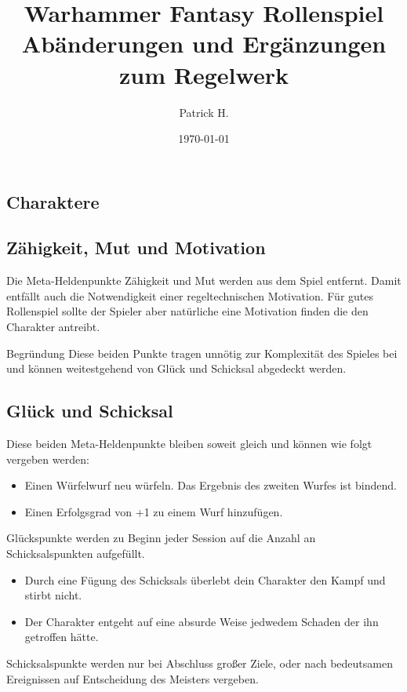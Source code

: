 \documentclass[a4paper]{article}
\title{%
  Warhammer Fantasy Rollenspiel\\
  \large Abänderungen und Ergänzungen zum Regelwerk}
\author{Patrick H.}
\date{\today}
\begin{document}

\maketitle

\vspace{1em}

\begin{multicols}{2}
  



\section{Charaktere}

\subsection{Zähigkeit, Mut und Motivation}
Die Meta-Heldenpunkte Zähigkeit und Mut werden aus dem Spiel entfernt. 
Damit entfällt auch die Notwendigkeit einer regeltechnischen Motivation. 
Für gutes Rollenspiel sollte der Spieler aber natürliche eine Motivation finden die den Charakter antreibt.

\begin{DndComment}{Begründung}
  Diese beiden Punkte tragen unnötig zur Komplexität des Spieles bei und können weitestgehend von Glück und Schicksal abgedeckt werden.
\end{DndComment}

\subsection{Glück und Schicksal}
Diese beiden Meta-Heldenpunkte bleiben soweit gleich und können wie folgt vergeben werden:
\begin{itemize}
  \item Einen Würfelwurf neu würfeln. Das Ergebnis des zweiten Wurfes ist bindend.
  \item Einen Erfolgsgrad von +1 zu einem Wurf hinzufügen.
\end{itemize}
Glückspunkte werden zu Beginn jeder Session auf die Anzahl an Schicksalspunkten aufgefüllt.

\begin{itemize}
  \item Durch eine Fügung des Schicksals überlebt dein Charakter den Kampf und stirbt nicht.
  \item Der Charakter entgeht auf eine absurde Weise jedwedem Schaden der ihn getroffen hätte.
\end{itemize}
Schicksalspunkte werden nur bei Abschluss großer Ziele, oder nach bedeutsamen Ereignissen auf Entscheidung des Meisters vergeben.


\end{multicols}
\end{document}
